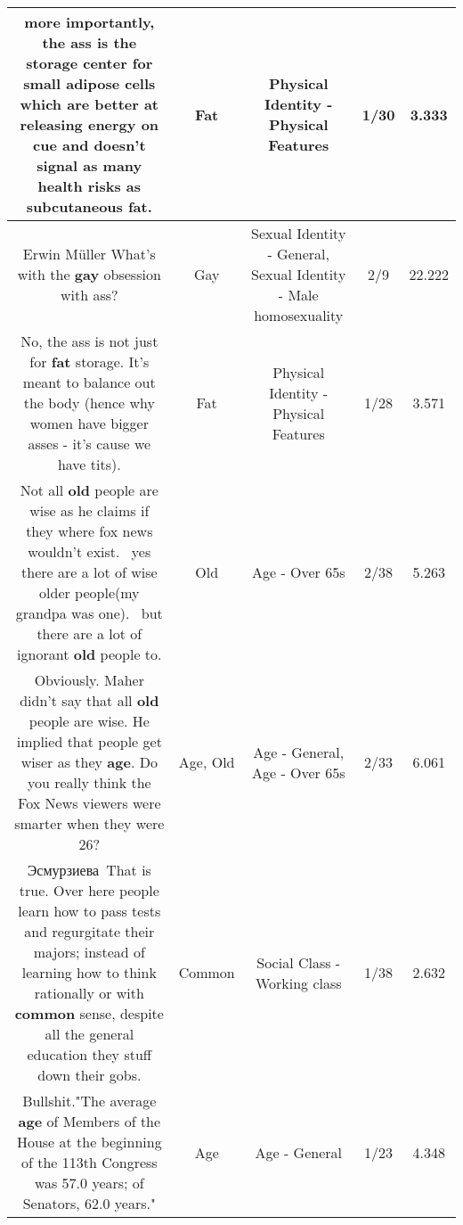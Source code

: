 \documentclass[11pt]{article}
\newlength\mylength
\begin{document}
\begin{center}
\begin{longtable}{|C{.65\mylength}|C{.30\mylength}|C{.12\mylength}|C{.12\mylength}|C{.12\mylength}|}
  \small more importantly, the ass is the storage center for small adipose cells which are better at releasing energy on cue and doesn't signal as many health risks as subcutaneous \textbf{fat}.\normalsize   & Fat & Physical Identity - Physical Features & 1/30 & 3.333 \\  \hline
  \small Erwin Müller What's with the \textbf{g\textbf{ay}} obsession with ass?\normalsize   & Gay & Sexual Identity - General, Sexual Identity - Male homosexuality & 2/9 & 22.222 \\  \hline
  \small No, the ass is not just for \textbf{fat} storage. It's meant to balance out the body (hence why women have bigger asses - it's cause we have tits).\normalsize   & Fat & Physical Identity - Physical Features & 1/28 & 3.571 \\  \hline
  \small Not all \textbf{old} people are wise as he claims if they where fox news wouldn't exist.  yes there are a lot of wise older people(my grandpa was one).  but there are a lot of ignorant \textbf{old} people to.\normalsize   & Old & Age - Over 65s & 2/38 & 5.263 \\  \hline
  \small Obviously. Maher didn't say that all \textbf{old} people are wise. He implied that people get wiser as they \textbf{age}. Do you really think the Fox News viewers were smarter when they were 26?\normalsize   & Age, Old & Age - General, Age - Over 65s & 2/33 & 6.061 \\  \hline
  \small {} Эсмурзиева That is true. Over here people learn how to pass tests and regurgitate their majors; instead of learning how to think rationally or with \textbf{common} sense, despite all the general education they stuff down their gobs.\normalsize   & Common & Social Class - Working class & 1/38 & 2.632 \\  \hline
  \small Bullshit."The average \textbf{age} of Members of the House at the beginning of the 113th Congress was 57.0 years; of Senators, 62.0 years."\normalsize   & Age & Age - General & 1/23 & 4.348 \\  \hline

\end{longtable}
\end{center}
\end{document}

